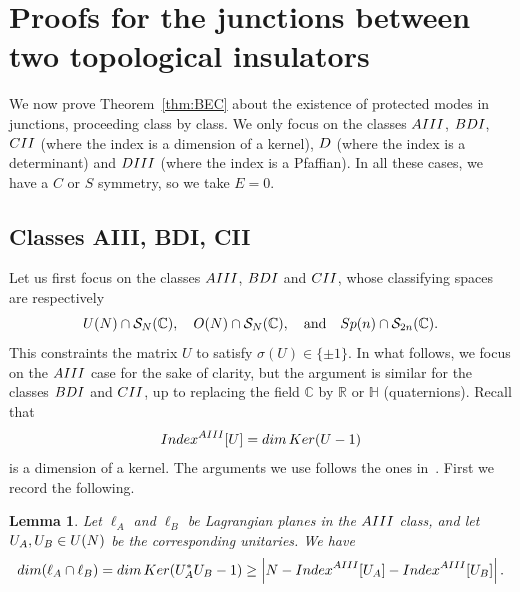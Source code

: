 \documentclass[11pt]{amsart}
\numberwithin{equation}{section} %
\newtheorem{lemma}[theorem]{Lemma}
\newcommand\1{{\mathds 1}}
\def\C{{\mathbb C}}
\def\R{{\mathbb R}}
\def\cS{{\mathcal S}}
\def\rAIII{{\rm AIII}}
\def\rBDI{{\rm BDI}}
\def\rD{{\rm D}}
\def\rDIII{{\rm DIII}}
\def\rCII{{\rm CII}}
\def\U{{\rm U}}
\def\O{{\rm O}}
\def\Sp{{\rm Sp}}
\def\Index{{\rm Index}}
\def\Ker{{\rm Ker }}
\def\dim{{\rm dim }}
\begin{document}
\section{Proofs for the junctions between two topological insulators}
\label{sec:proof:junctions}

We now prove Theorem~\ref{thm:BEC} about the existence of protected modes in junctions, proceeding class by class. We only focus on the classes $\rAIII$, $\rBDI$, $\rCII$ (where the index is a dimension of a kernel), $\rD$ (where the index is a determinant) and $\rDIII$ (where the index is a Pfaffian). In all these cases, we have a $C$ or $S$ symmetry, so we take $E = 0$.

\subsection{Classes AIII, BDI, CII}
Let us first focus on the classes $\rAIII$, $\rBDI$ and $\rCII$, whose classifying spaces are respectively
\[
    \U(N) \cap \cS_N(\C), \quad \O(N) \cap \cS_N(\C), \quad \text{and} \quad \Sp(n) \cap \cS_{2n}(\C).
\]
This constraints the matrix $U$ to satisfy $\sigma(U) \in \{ \pm 1\}$. In what follows, we focus on the $\rAIII$ case for the sake of clarity, but the argument is similar for the classes $\rBDI$ and $\rCII$, up to replacing the field $\C$ by $\R$ or $\mathbb{H}$ (quaternions). Recall that
\[
     \Index^{\rAIII} [U] = \dim \, \Ker(U - 1)
\]
is a dimension of a kernel. The arguments we use follows the ones in~\cite{Gom-}. First we record the following. 
\begin{lemma} \label{lem:crossing_lagrangian_AIII}
    Let $\ell_A$ and $\ell_B$ be Lagrangian planes in the $\rAIII$ class, and let $U_A, U_B \in \U(N)$ be the corresponding unitaries. We have
    \[
        \dim (\ell_A \cap \ell_B) = \dim \, \Ker (U_A^* U_B - 1) \ge \left| N - \Index^\rAIII[U_A] -  \Index^\rAIII[U_B] \right|.
    \]
\end{lemma}
\end{document}
